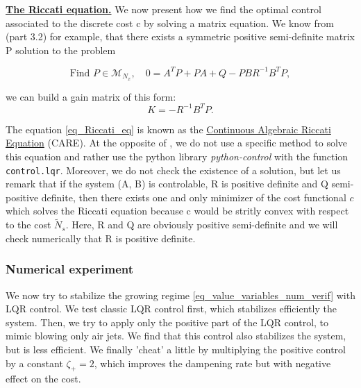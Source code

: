 \documentclass[12pt]{article}
\begin{document}
\underline{\textbf{The Riccati equation.}} We now present how we find the optimal control associated to the discrete cost c by solving a 
matrix equation. We know from \cite{A_Thompson_FLF_blowing_suction} (part 3.2) for example, that there exists a symmetric positive semi-definite
matrix P solution to the problem

\begin{equation}\label{eq_Riccati_eq}
    \text{Find } P\in \mathcal{M}_{N_x}, \quad 0=A^TP+PA+Q-PBR^{-1}B^TP, 
\end{equation}

 we can build a gain matrix of this form:
 \begin{equation}
    K = -R^{-1}B^TP.
 \end{equation}
 
 The equation \eqref{eq_Riccati_eq} is known as the \underline{Continuous Algebraic Riccati Equation} (CARE). At the opposite of
  \cite{holroyd2023linearquadraticregulationcontrol}, we do not use a specific method to solve this equation and rather use the python 
  library \textit{python-control} with the function \texttt{control.lqr}. Moreover, we do not check the existence of a solution, but let us 
  remark that if the system (A, B) is controlable,  R is positive definite and Q semi-positive definite, then
   there exists one and only minimizer of the cost functional $c$ which solves the Riccati equation because c would be stritly convex
   with respect to the cost $\tilde{N}_s$. Here, R and Q are obviously positive 
   semi-definite and we will check numerically that R is positive definite. 


 

\subsubsection{Numerical experiment}
We now try to stabilize the growing regime \eqref{eq_value_variables_num_verif} with LQR
control. We test classic LQR control first, which stabilizes efficiently the system. Then,
we try to apply only the positive part of the LQR control, to mimic blowing only air jets.
We find that this control also stabilizes the system, but is less efficient. We finally 'cheat' a little
by multiplying the positive control by a constant $\zeta_+=2$, which improves the dampening 
rate but with negative effect on the cost.
\\
\end{document}
